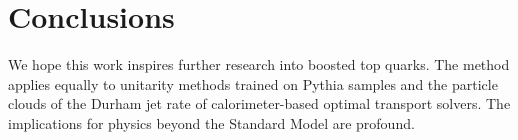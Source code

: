 \section{Conclusions}\label{sec:conclusions}

We hope this work inspires further research into boosted top quarks. The
method applies equally to unitarity methods trained on Pythia samples
and the particle clouds of the Durham jet rate of calorimeter-based
optimal transport solvers. The implications for physics beyond the
Standard Model are profound.

